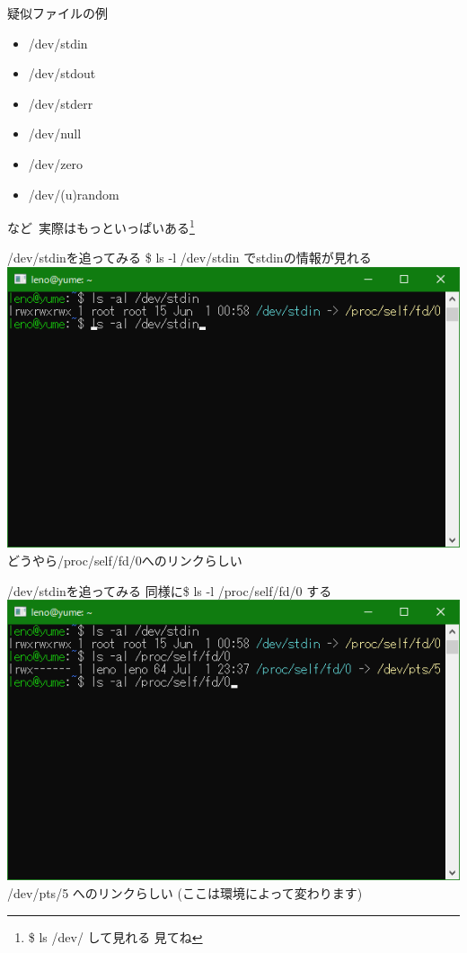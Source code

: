 \documentclass[uplatex, dvipdfmx, unicode]{beamer}
\begin{document}
\begin{frame}{疑似ファイルの例}
  \begin{itemize}
    \item{/dev/stdin}
    \item{/dev/stdout}
    \item{/dev/stderr}
    \item{/dev/null}
    \item{/dev/zero}
    \item{/dev/(u)random}
  \end{itemize}
  \vspace{0.2in}
  など\ 実際はもっといっぱいある\footnote{\$ ls /dev/ して見れる 見てね}
\end{frame}

\begin{frame}{/dev/stdinを追ってみる}
  \$ ls -l /dev/stdin でstdinの情報が見れる \\
  \vspace{0.2in}
  {
    \centering
    \includegraphics[keepaspectratio, scale=.5]{./img/stdin.png} \\
  }
  どうやら/proc/self/fd/0へのリンクらしい \\
\end{frame}

\begin{frame}{/dev/stdinを追ってみる}
  同様に\$ ls -l /proc/self/fd/0 する \\
  \vspace{0.2in}
  {
    \centering
    \includegraphics[keepaspectratio, scale=.5]{./img/pts.png} \\
  }
  /dev/pts/5 へのリンクらしい (ここは環境によって変わります)
\end{frame}
\end{document}
